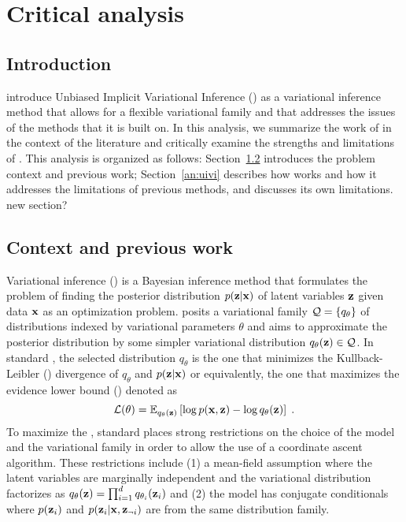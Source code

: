 \documentclass[10pt]{article}
\title{\todo}
\author{Kenny Chiu}
\date{\today}
\begin{document}
\maketitle


\newpage


\section{Critical analysis}

\subsection{Introduction}

\todo \citet{Titsias:2019} introduce Unbiased Implicit Variational Inference (\uivi) as a variational inference method that allows for a flexible variational family and that addresses the issues of the methods that it is built on. In this analysis, we summarize the work of \citet{Titsias:2019} in the context of the literature and critically examine the strengths and limitations of \uivi. This analysis is organized as follows: Section~\ref{an:literature} introduces the problem context and previous work; Section~\ref{an:uivi} describes how \uivi works and how it addresses the limitations of previous methods, and discusses its own limitations. \todo new section?

\subsection{Context and previous work} \label{an:literature}

Variational inference (\vi) \citep{Jordan:1999} is a Bayesian inference method that formulates the problem of finding the posterior distribution $p(\mathbf{z}|\mathbf{x})$ of latent variables $\mathbf{z}$ given data $\mathbf{x}$ as an optimization problem. \vi posits a variational family $\mathcal{Q}=\{q_\theta\}$ of distributions indexed by variational parameters $\theta$ and aims to approximate the posterior distribution by some simpler variational distribution $q_\theta(\mathbf{z})\in\mathcal{Q}$. In standard \vi, the selected distribution $q_\theta$ is the one that minimizes the Kullback-Leibler (\kl) divergence of $q_\theta$ and $p(\mathbf{z}|\mathbf{x})$ or equivalently, the one that maximizes the evidence lower bound (\elbo) denoted as
\[
\mathcal{L}(\theta) = \mathbb{E}_{q_\theta(\mathbf{z})}\left[\log p(\mathbf{x},\mathbf{z}) - \log q_\theta(\mathbf{z})\right] \;.
\]
To maximize the \elbo, standard \vi places strong restrictions on the choice of the model and the variational family in order to allow the use of a coordinate ascent algorithm. These restrictions include (1) a mean-field assumption where the latent variables are marginally independent and the variational distribution factorizes as $q_\theta(\mathbf{z})=\prod_{i=1}^dq_{\theta_i}(\mathbf{z}_i)$ and (2) the model has conjugate conditionals where $p(\mathbf{z}_i)$ and $p(\mathbf{z}_i|\mathbf{x},\mathbf{z}_{\neg i})$ are from the same distribution family.
\\
\end{document}

